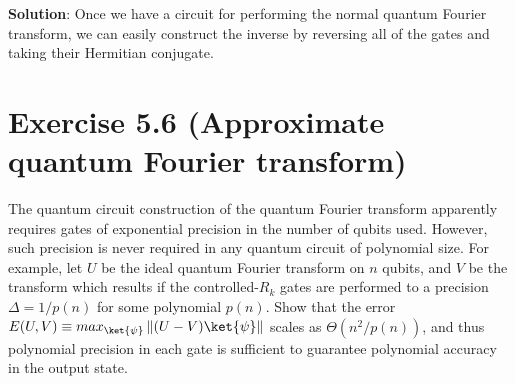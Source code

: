 \documentclass{book}
\begin{document}
    \textbf{Solution}: Once we have a circuit for performing the normal quantum Fourier transform, we can easily construct the inverse by reversing all of the gates and taking their Hermitian conjugate. 

\section*{Exercise 5.6 (Approximate quantum Fourier transform)}
    The quantum circuit construction of the quantum Fourier transform apparently requires gates of exponential precision in the number of qubits used. However, such precision is never required in any quantum circuit of polynomial size. For example, let $U$ be the ideal quantum Fourier transform on $n$ qubits, and $V$ be the transform which results if the controlled-$R_k$ gates are performed to a precision $\Delta = 1/p(n)$ for some polynomial $p(n)$. Show that the error $E(U, V) \equiv max_{\ket{\psi}} \left\|(U - V)\ket{\psi}\right\|$ scales as $\Theta(n^2/p(n))$, and thus polynomial precision in each gate is sufficient to guarantee polynomial accuracy in the output state.
\end{document}
